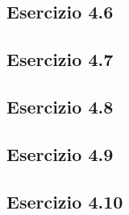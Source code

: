 \subsection{\textbf{Esercizio 4.6}}

\subsection{\textbf{Esercizio 4.7}}

\subsection{\textbf{Esercizio 4.8}}

\subsection{\textbf{Esercizio 4.9}}

\subsection{\textbf{Esercizio 4.10}}

